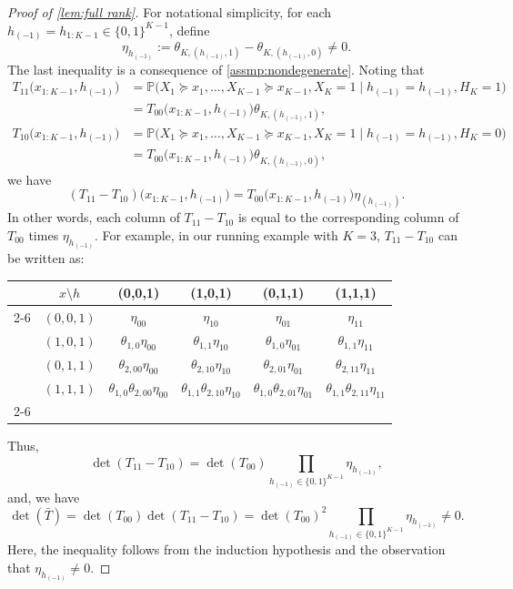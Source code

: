 \documentclass[10pt]{article} %
\newcommand{\PP}{\mathbb P}
\begin{document}
\begin{proof}[Proof of \cref{lem:full rank}]
    
    For notational simplicity, for each $h_{(-1)} = h_{1:K-1} \in \{0,1\}^{K-1}$, define $$\eta_{h_{(-1)}} := \theta_{K,(h_{(-1)},1)} - \theta_{K,(h_{(-1)},0)}\neq 0.$$
    The last inequality is a consequence of \cref{assmp:nondegenerate}. 
    Noting that
    \begin{align*}
        T_{11}\big(x_{1:K-1}, h_{(-1)} \big) &= \PP \big(X_1 \succeq x_1, \ldots, X_{K-1} \succeq x_{K-1}, X_{K} = 1 \mid h_{(-1)} = h_{(-1)}, H_K = 1 \big) \\
        &= T_{00}\big(x_{1:K-1}, h_{(-1)} \big) \theta_{K,(h_{(-1)},1)}, \\
        T_{10}\big(x_{1:K-1}, h_{(-1)} \big) &= \PP \big(X_1 \succeq x_1, \ldots, X_{K-1} \succeq x_{K-1}, X_{K} = 1 \mid h_{(-1)} = h_{(-1)}, H_K = 0 \big) \\
        &= T_{00}\big(x_{1:K-1}, h_{(-1)} \big) \theta_{K,(h_{(-1)},0)},
    \end{align*}
    we have 
    $$(T_{11}-T_{10})\big(x_{1:K-1}, h_{(-1)} \big) = T_{00}\big(x_{1:K-1}, h_{(-1)} \big) \eta_{(h_{(-1)})}.$$
    In other words, each column of $T_{11}-T_{10}$ is equal to the corresponding column of $T_{00}$ times $\eta_{h_{(-1)}}$. For example, in our running example with $K = 3$, $T_{11}-T_{10}$ can be written as:
    \begin{table}[h!]
        \centering
        \begin{tabular}{cc|cccc}
            & $x \setminus h$ & (0,0,1) & (1,0,1) & (0,1,1) & (1,1,1) \\ %
            \cmidrule{2-6}
            \multirow{4}{*}{$T_{11}-T_{10} =$} & $(0,0,1)$ & $\eta_{00}$ & $\eta_{10}$ & $\eta_{01}$ & $\eta_{11}$ \\
            & $(1, 0, 1)$ & $\theta_{1,0} \eta_{00}$ & $\theta_{1,1} \eta_{10}$ & $\theta_{1,0} \eta_{01}$ & $\theta_{1,1} \eta_{11}$ \\
            & $(0, 1, 1)$ & $\theta_{2,00} \eta_{00}$ & $\theta_{2,10} \eta_{10}$ & $\theta_{2,01} \eta_{01}$ & $\theta_{2,11} \eta_{11}$ \\
            & $(1, 1, 1)$ & $\theta_{1,0} \theta_{2,00} \eta_{00}$ & $\theta_{1,1} \theta_{2,10} \eta_{10}$ & $\theta_{1,0} \theta_{2,01} \eta_{01}$ & $\theta_{1,1} \theta_{2,11} \eta_{11}$ \\
            \cmidrule{2-6}
        \end{tabular}
    \end{table}
    
    Thus, $$\det(T_{11}-T_{10}) = \det(T_{00}) \prod_{h_{(-1)} \in \{0,1\}^{K-1}} \eta_{h_{(-1)}},$$
    and, we have 
    $$\det(\bar{T}) = \det(T_{00}) \det(T_{11}-T_{10}) = \det(T_{00})^2 \prod_{h_{(-1)} \in \{0,1\}^{K-1}} \eta_{h_{(-1)}} \neq 0.$$
    Here, the inequality follows from the induction hypothesis and the observation that $\eta_{h_{(-1)}} \neq 0$.
\end{proof}
\end{document}

